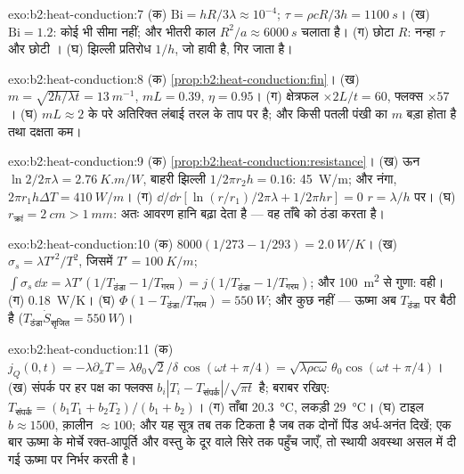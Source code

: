 \begin{solution}{exo:b2:heat-conduction:7}
(क) $\mathrm{Bi} = hR/3\lambda \approx 10^{-4}$; $\tau = \rho cR/3h = \qty{1100}{s}$।
(ख) $\mathrm{Bi} = 1.2$: कोई भी सीमा नहीं; और भीतरी काल $R^2/a \approx
\qty{6000}{s}$ चलाता है। (ग) छोटा $R$: नन्हा $\tau$ और छोटी ।
(घ) झिल्ली प्रतिरोध $1/h$, जो हावी है, गिर जाता है।
\end{solution}

\begin{solution}{exo:b2:heat-conduction:8}
(क) \cref{prop:b2:heat-conduction:fin}। (ख) $m = \sqrt{2h/\lambda t} =
\qty{13}{m^{-1}}$, $mL = 0.39$, $\eta = 0.95$। (ग) क्षेत्रफल $\times 2L/t = 60$, फ्लक्स
$\times 57$। (घ) $mL \approx 2$ के परे अतिरिक्त लंबाई तरल के
ताप पर है; और किसी पतली पंखी का $m$ बड़ा होता है तथा दक्षता कम।
\end{solution}

\begin{solution}{exo:b2:heat-conduction:9}
(क) \cref{prop:b2:heat-conduction:resistance}। (ख) ऊन $\ln 2/2\pi\lambda =
\qty{2.76}{K.m/W}$, बाहरी झिल्ली $1/2\pi r_2h = 0.16$: \qty{45}{W/m}; और नंगा,
$2\pi r_1h\Delta T = \qty{410}{W/m}$। (ग) $\dd/\dd r[\ln(r/r_1)/2\pi\lambda + 1/2\pi hr]
= 0$ $r = \lambda/h$ पर। (घ) $r_{\text{क्रां}} = \qty{2}{cm} > \qty{1}{mm}$: अतः आवरण
हानि बढ़ा देता है --- वह ताँबे को ठंडा करता है।
\end{solution}

\begin{solution}{exo:b2:heat-conduction:10}
(क) $8000(1/273 - 1/293) = \qty{2.0}{W/K}$। (ख) $\sigma_s = \lambda T'^2/T^2$, जिसमें
$T' = \qty{100}{K/m}$; $\int\sigma_s\,\dd x = \lambda T'(1/T_{\text{ठंडा}} - 1/T_{\text{गरम}})
= j(1/T_{\text{ठंडा}} - 1/T_{\text{गरम}})$; और \qty{100}{m^2} से गुणा: वही। (ग)
\qty{0.18}{W/K}। (घ) $\Phi(1 - T_{\text{ठंडा}}/T_{\text{गरम}}) = \qty{550}{W}$; और कुछ नहीं
--- ऊष्मा अब $T_{\text{ठंडा}}$ पर बैठी है ($T_{\text{ठंडा}}\dot S_{\text{सृजित}} = \qty{550}{W}$)।
\end{solution}

\begin{solution}{exo:b2:heat-conduction:11}
(क) $j_Q(0,t) = -\lambda\partial_xT = \lambda\theta_0\sqrt2/\delta\,\cos(\omega t +
\pi/4) = \sqrt{\lambda\rho c\omega}\,\theta_0\cos(\omega t + \pi/4)$। (ख) संपर्क पर हर
पक्ष का फ्लक्स $b_i|T_i - T_{\text{संपर्क}}|/\sqrt{\pi t}$ है; बराबर रखिए:
$T_{\text{संपर्क}} = (b_1T_1 + b_2T_2)/(b_1 + b_2)$। (ग) ताँबा \qty{20.3}{\celsius},
लकड़ी \qty{29}{\celsius}। (घ) टाइल $b \approx 1500$, क़ालीन $\approx 100$; और यह
सूत्र तब तक टिकता है जब तक दोनों पिंड अर्ध-अनंत दिखें; एक बार ऊष्मा के
मोर्चे रक्त-आपूर्ति और वस्तु के दूर वाले सिरे तक पहुँच जाएँ, तो स्थायी
अवस्था असल में दी गई ऊष्मा पर निर्भर करती है।
\end{solution}

